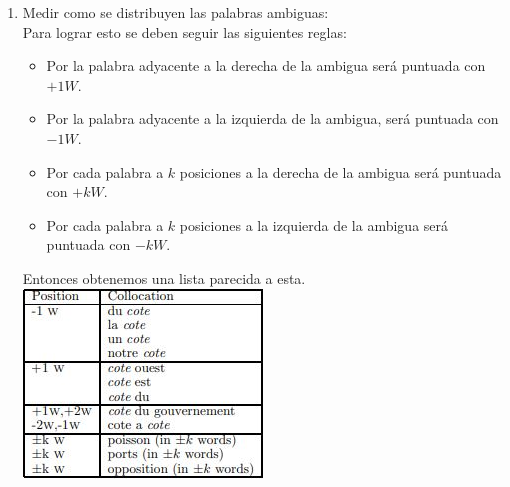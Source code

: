 \begin{enumerate}
    \item Medir como se distribuyen las palabras ambiguas:\\
    Para lograr esto se deben seguir las siguientes reglas:
    \begin{itemize}
        \item Por la palabra adyacente a la derecha de la ambigua será puntuada con $+1W$.
        \item Por la palabra adyacente a la izquierda de la ambigua, será puntuada con $-1W$.
        \item Por cada palabra a $k$ posiciones a la derecha de la ambigua será puntuada con $+kW$.
        \item Por cada palabra a $k$ posiciones a la izquierda de la ambigua será puntuada con $-kW$.
    \end{itemize}
    Entonces obtenemos una lista parecida a esta.\cite{DecisionLists}\\
    \includegraphics[]{img/listas/Listas_Decision3.JPG}
    

\end{enumerate}
